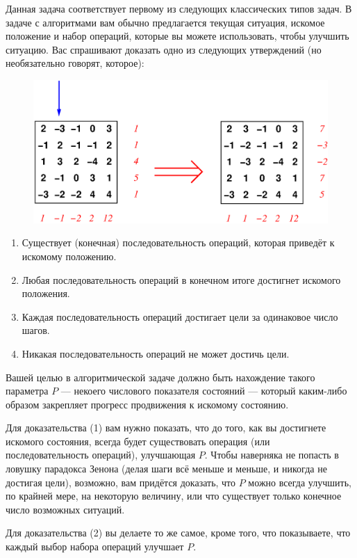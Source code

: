 Данная задача соответствует первому из следующих классических типов задач.
В задаче с алгоритмами вам обычно предлагается текущая ситуация, искомое положение и набор операций, которые вы можете использовать, чтобы улучшить ситуацию.
Вас спрашивают доказать одно из следующих утверждений (но необязательно говорят, которое):
\begin{figure}
\centering
\includegraphics[scale=0.6]{Figs/Algorithms/array}
\end{figure}
\begin{enumerate}[(1)]
\item Существует (конечная) последовательность операций, которая приведёт к искомому положению.
\item Любая последовательность операций в конечном итоге достигнет искомого положения.
\item Каждая последовательность операций достигает цели за одинаковое число шагов.
\item Никакая последовательность операций не может достичь цели.
\end{enumerate}

Вашей целью в алгоритмической задаче должно быть нахождение такого параметра $P$ --- некоего числового показателя состояний --- который каким-либо образом закрепляет прогресс продвижения к искомому состоянию.

Для доказательства (1) вам нужно показать, что до того, как вы достигнете искомого состояния, всегда будет существовать операция (или последовательность операций), улучшающая $P$.
Чтобы наверняка не попасть в ловушку парадокса Зенона (делая шаги всё меньше и меньше, и никогда не достигая цели), возможно, вам придётся доказать, что $P$ можно всегда улучшить, по крайней мере, на некоторую величину, или что существует только конечное число возможных ситуаций.

Для доказательства (2) вы делаете то же самое, кроме того, что показываете, что каждый выбор набора операций улучшает $P$.

